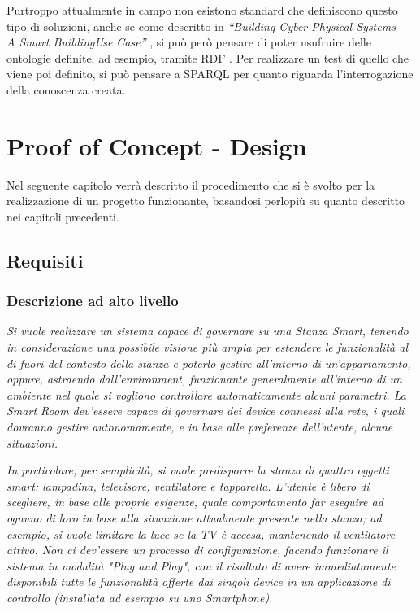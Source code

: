 \documentclass[12pt,a4paper,openright,oneside]{report}
\newcommand{\quotes}[1]{``#1''}
\begin{document}
Purtroppo attualmente in campo non esistono standard che definiscono questo tipo di soluzioni, anche se come descritto in \textit{\quotes{Building Cyber-Physical Systems - A Smart BuildingUse Case}} \cite{smartbuilding}, si può però pensare di poter usufruire delle ontologie definite, ad esempio, tramite RDF \cite{rdf}. Per realizzare un test di quello che viene poi definito, si può pensare a SPARQL \cite{sparql} per quanto riguarda l'interrogazione della conoscenza creata.



\clearpage{\pagestyle{empty}\cleardoublepage}
\chapter{Proof of Concept - Design}           %
\lhead[\fancyplain{}{\bfseries\thepage}]{\fancyplain{}{\bfseries\rightmark}}  

Nel seguente capitolo verrà descritto il procedimento che si è svolto per la realizzazione di un progetto funzionante, basandosi perlopiù su quanto descritto nei capitoli precedenti.

\section{Requisiti}

\subsection{Descrizione ad alto livello}
\textsl{Si vuole realizzare un sistema capace di governare su una Stanza Smart, tenendo in considerazione una possibile visione più ampia per estendere le funzionalità al di fuori del contesto della stanza e poterlo gestire all'interno di un'appartamento, oppure, astraendo dall'environment, funzionante generalmente all'interno di un ambiente nel quale si vogliono controllare automaticamente alcuni parametri. La Smart Room dev'essere capace di governare dei device connessi alla rete, i quali dovranno gestire autonomamente, e in base alle preferenze dell'utente, alcune situazioni.\\}

\textsl{In particolare, per semplicità, si vuole predisporre la stanza di quattro oggetti smart: lampadina, televisore, ventilatore e tapparella. L'utente è libero di scegliere, in base alle proprie esigenze, quale comportamento far eseguire ad ognuno di loro in base alla situazione attualmente presente nella stanza; ad esempio, si vuole limitare la luce se la TV è accesa, mantenendo il ventilatore attivo. Non ci dev'essere un processo di configurazione, facendo funzionare il sistema in modalità "Plug and Play", con il risultato di avere immediatamente disponibili tutte le funzionalità offerte dai singoli device in un applicazione di controllo (installata ad esempio su uno Smartphone).}
\end{document}
